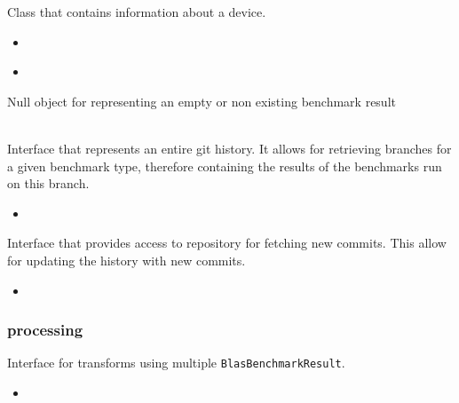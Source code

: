 \label{b:30}
{Class that contains information about a device.}
{
  \begin{itemize}
      \item {}
  \end{itemize}
}
{
  \begin{itemize}
      \item {}
  \end{itemize}
}

\label{b:31}
{Null object for representing an empty or non existing benchmark result}
{ \\ }
{ \\ }

\label{b:32}
{Interface that represents an entire git history. It allows for retrieving branches for a given benchmark type, therefore containing the results of the benchmarks run on this branch.}
{
  \begin{itemize}
      \item {}
  \end{itemize}
}

\label{b:33}
{Interface that provides access to repository for fetching new commits. This allow for updating the history with new commits.}
{
  \begin{itemize}
      \item {}
  \end{itemize}
}

\subsubsection{processing}

\label{b:34}
{Interface for transforms using multiple \texttt{BlasBenchmarkResult}.}
{
  \begin{itemize}
      \item {}
  \end{itemize}
}

